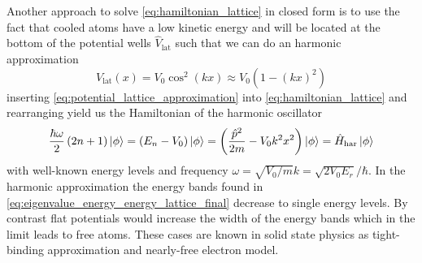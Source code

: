 Another approach to solve \cref{eq:hamiltonian_lattice} in closed form is to
use the fact that cooled atoms have a low kinetic energy and will be located
at the bottom of the potential wells $\hat{V}_\text{lat}$ such that we can
do an harmonic approximation
\begin{equation}
  V_\text{lat}(x)
  =V_0\cos^2(kx)
  \approx V_0\left(1-(kx)^2\right)
  \label{eq:potential_lattice_approximation}
\end{equation}
inserting \cref{eq:potential_lattice_approximation} into
\cref{eq:hamiltonian_lattice} and rearranging yield us the Hamiltonian of
the harmonic oscillator
\begin{equation}
  \frac{\hbar\omega}{2}\left(2n+1\right)\ket{\phi}
  =\left(E_n-V_0\right)\ket{\phi}
  =\left(\frac{\hat{p}^2}{2m}-V_0k^2x^2\right)\ket{\phi}
  =\hat{H}_\text{har}\ket{\phi}
\end{equation}
with well-known energy levels and frequency
$\omega=\sqrt{V_0/m}k=\sqrt{2V_0E_r}/\hbar$. In the harmonic approximation
the energy bands found in \cref{eq:eigenvalue_energy_energy_lattice_final}
decrease to single energy levels. By contrast flat potentials would increase
the width of the energy bands which in the limit leads to free atoms. These
cases are known in solid state physics as tight-binding approximation and
nearly-free electron model.

